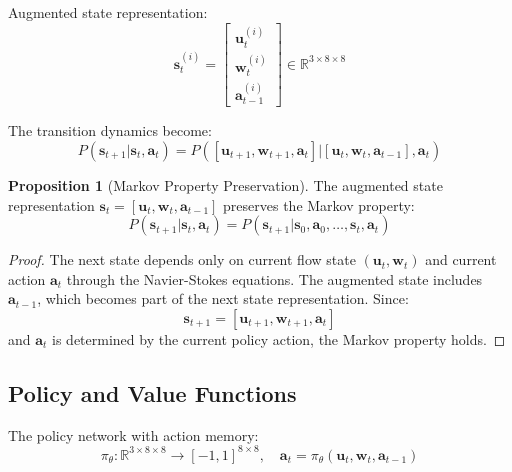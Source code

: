 \documentclass[11pt,a4paper]{article}
\newcommand{\R}{\mathbb{R}}
\theoremstyle{definition}
\newtheorem{proposition}{Proposition}
\begin{document}
Augmented state representation:
\begin{equation}
    \mathbf{s}_t^{(i)} = \begin{bmatrix}
        \mathbf{u}_t^{(i)} \\
        \mathbf{w}_t^{(i)} \\
        \mathbf{a}_{t-1}^{(i)}
    \end{bmatrix} \in \R^{3 \times 8 \times 8}
\end{equation}

The transition dynamics become:
\begin{equation}
    P(\mathbf{s}_{t+1} | \mathbf{s}_t, \mathbf{a}_t) = P([\mathbf{u}_{t+1}, \mathbf{w}_{t+1}, \mathbf{a}_t] | [\mathbf{u}_t, \mathbf{w}_t, \mathbf{a}_{t-1}], \mathbf{a}_t)
\end{equation}

\begin{proposition}[Markov Property Preservation]
The augmented state representation $\mathbf{s}_t = [\mathbf{u}_t, \mathbf{w}_t, \mathbf{a}_{t-1}]$ preserves the Markov property:
\begin{equation}
    P(\mathbf{s}_{t+1} | \mathbf{s}_t, \mathbf{a}_t) = P(\mathbf{s}_{t+1} | \mathbf{s}_0, \mathbf{a}_0, \ldots, \mathbf{s}_t, \mathbf{a}_t)
\end{equation}
\end{proposition}

\begin{proof}
The next state depends only on current flow state $(\mathbf{u}_t, \mathbf{w}_t)$ and current action $\mathbf{a}_t$ through the Navier-Stokes equations. The augmented state includes $\mathbf{a}_{t-1}$, which becomes part of the next state representation. Since:
\begin{equation}
    \mathbf{s}_{t+1} = [\mathbf{u}_{t+1}, \mathbf{w}_{t+1}, \mathbf{a}_t]
\end{equation}
and $\mathbf{a}_t$ is determined by the current policy action, the Markov property holds.
\end{proof}

\subsection{Policy and Value Functions}

The policy network with action memory:
\begin{equation}
    \pi_\theta: \R^{3 \times 8 \times 8} \to [-1,1]^{8 \times 8}, \quad \mathbf{a}_t = \pi_\theta(\mathbf{u}_t, \mathbf{w}_t, \mathbf{a}_{t-1})
\end{equation}
\end{document}
